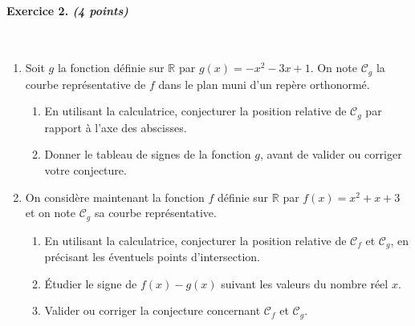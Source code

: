 \documentclass[11pt]{article}
\begin{document}
\paragraph{Exercice 2. \emph{(4 points)}}~\\
\begin{enumerate} %
  \item Soit $g$ la fonction définie sur $\mathbb{R}$ par $g(x)
= -x^2-3x+1$. On note $\mathscr C_g$ la courbe représentative de $f$ dans le plan
muni d'un repère orthonormé.
\begin{enumerate}
  \item En utilisant la calculatrice, conjecturer la position relative de
    $\mathscr C_g$ par rapport à l'axe des abscisses.
  \item Donner le tableau de signes de la fonction $g$, avant de valider ou
    corriger votre conjecture.
\end{enumerate}
\item On considère maintenant la fonction $f$ définie sur $\mathbb{R}$ par
$f(x)=x^2+x+3$ et on note $\mathscr C_g$ sa courbe représentative.
\begin{enumerate}
  \item En utilisant la calculatrice, conjecturer la position relative de
    $\mathscr C_f$ et $\mathscr C_g$, en précisant les éventuels points
    d'intersection.
  \item Étudier le signe de $f(x)-g(x)$ suivant les valeurs du nombre réel $x$.
  \item Valider ou corriger la conjecture concernant $\mathscr C_f$ et $\mathscr
    C_g$.
\end{enumerate}
\end{enumerate}
\end{document}
